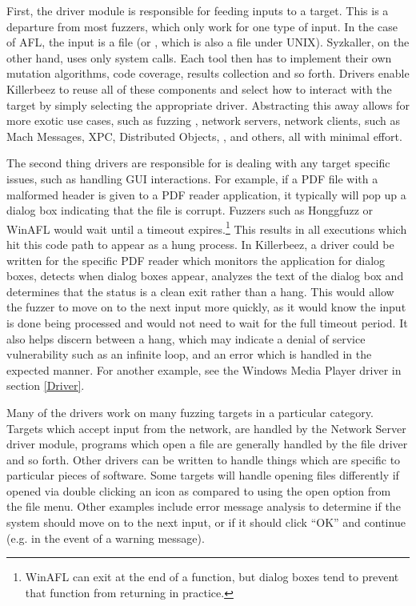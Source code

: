 First, the driver module is responsible for feeding inputs to a target.  This
is a departure from most fuzzers, which only work for one type of input.  In
the case of AFL, the input is a file (or \stdin{}, which is also a file under
UNIX).  Syzkaller\cite{syzkaller}, on the other hand, uses only system calls.
Each tool then has to implement their own mutation algorithms, code coverage,
results collection and so forth. Drivers enable Killerbeez to reuse all of
these components and select how to interact with the target by simply selecting
the appropriate driver.  Abstracting this away allows for more exotic use
cases, such as fuzzing \IOCTLs{}, network servers, network clients, \IPC{} such as
Mach Messages, XPC, Distributed Objects, \COM{}, and others, all with minimal
effort.

The second thing drivers are responsible for is dealing with any target
specific issues, such as handling GUI interactions.  For example, if a PDF file
with a malformed header is given to a PDF reader application, it typically will
pop up a dialog box indicating that the file is corrupt. Fuzzers such as
Honggfuzz or WinAFL\cite{winafl} would wait until a timeout expires.\footnote{WinAFL can
exit at the end of a function, but dialog boxes tend to prevent that function
from returning in practice.} This results in all executions which hit this code
path to appear as a hung process.  In Killerbeez, a driver could be written for
the specific PDF reader which monitors the application for dialog boxes,
detects when dialog boxes appear, analyzes the text of the dialog box and
determines that the status is a clean exit rather than a hang.  This would allow
the fuzzer to move on to the next input more quickly, as it would know the
input is done being processed and would not need to wait for the full timeout
period.  It also helps discern between a hang, which may indicate a denial of
service vulnerability such as an infinite loop, and an error which is handled
in the expected manner. For another example, see the Windows Media Player
driver in section \ref{Driver}.

Many of the drivers work on many fuzzing targets in a particular category.
Targets which accept input from the network, are handled by the Network Server
driver module, programs which open a file are generally handled by the file
driver and so forth.  Other drivers can be written to handle things which are
specific to particular pieces of software.  Some targets will handle opening files
differently if opened via double clicking an icon as compared to using the open
option from the file menu. Other examples include error message analysis to
determine if the system should move on to the next input, or if it should click
``OK'' and continue (e.g. in the event of a warning message).

